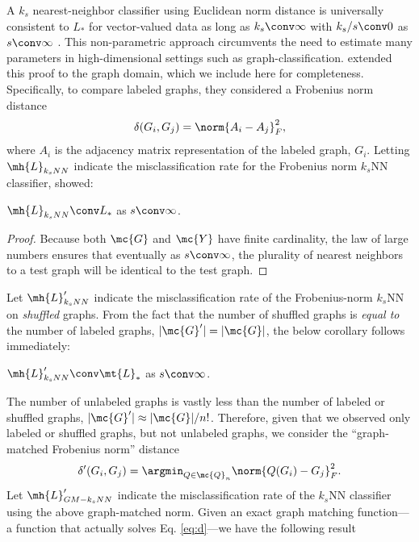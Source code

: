 A $k_s$ nearest-neighbor classifier 
using Euclidean norm distance
is universally consistent to $L_*$ for vector-valued data 
as long as $k_s \conv \infty$ with $k_s/s \conv 0$ as $s \conv \infty$ \cite{Stone1977}. This non-parametric approach circumvents the need to estimate many parameters in high-dimensional settings such as graph-classification. \cite{VP11_super} extended this proof to the graph domain, which we include here for completeness.  Specifically, to compare labeled graphs, they considered a Frobenius norm distance
\begin{align}
	\delta(G_i,G_j)=\norm{A_i-A_j}_F^2,
\end{align}
where $A_i$ is the adjacency matrix representation of the labeled graph, $G_i$.  Letting $\mh{L}_{k_sNN}$ indicate the misclassification rate for the Frobenius norm $k_s$NN classifier, \cite{VP11_super} showed:
\begin{thm} \label{thm:5}
	$\mh{L}_{k_sNN} \conv L_*$ as $s \conv \infty$.
\end{thm}
\begin{proof}
Because both $\mc{G}$ and $\mc{Y}$ have finite cardinality, the law of large numbers ensures that eventually as $s \conv \infty$, the plurality of nearest neighbors to a test graph will be identical to the test graph. 
\end{proof}
Let $\mh{L}_{k_sNN}'$ indicate the misclassification rate of the Frobenius-norm $k_s$NN on \emph{shuffled} graphs.  From the fact that the number of shuffled graphs is \emph{equal to} the number of labeled graphs, $|\mc{G}'| = |\mc{G}|$,  the below corollary follows immediately:
\begin{coro} \label{cor:1}
	$\mh{L}_{k_sNN}' \conv \mt{L}_*$ as $s \conv \infty$.
\end{coro}
The number of unlabeled graphs is vastly less than the number of labeled or shuffled graphs, $|\mc{G}'| \approx |\mc{G}|/n!$.  Therefore, given that we observed only labeled or shuffled graphs, but not unlabeled graphs, we consider the ``graph-matched Frobenius norm'' distance
\begin{align} \label{eq:d}
\delta'(G_i,G_j)=\argmin_{Q \in \mc{Q}_n}\norm{Q(G_i)-G_j}_F^2.	
\end{align}
Let $\mh{L}_{GM-k_sNN}'$ indicate the misclassification rate of the $k_s$NN classifier using the above graph-matched norm.  Given an exact graph matching function---a function that actually solves Eq. \eqref{eq:d}---we have the following result
